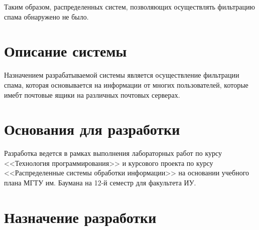 Таким образом, распределенных систем, позволяющих осуществлять фильтрацию спама обнаружено не было.

\section{Описание системы}
Назначением разрабатываемой системы является осуществление фильтрации спама, которая основывается на информации от многих пользователей, которые имебт почтовые ящики на различных почтовых серверах.


\section{Основания для разработки}
Разработка ведется в рамках выполнения лабораторных работ по курсу <<Технология программирования>> и курсового проекта по курсу <<Распределенные системы обработки информации>> на основании учебного плана МГТУ им. Баумана на 12-й семестр для факультета ИУ.

\section{Назначение разработки}